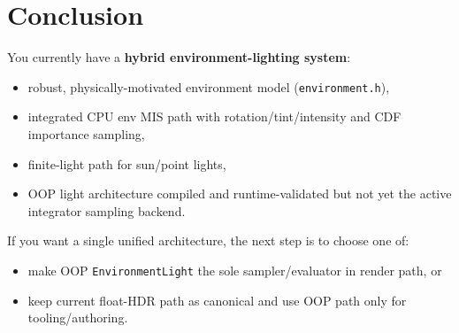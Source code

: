 \documentclass[11pt]{article}
\begin{document}
\section{Conclusion}
You currently have a \textbf{hybrid environment-lighting system}:
\begin{itemize}[leftmargin=1.5em]
  \item robust, physically-motivated environment model (\verb|environment.h|),
  \item integrated CPU env MIS path with rotation/tint/intensity and CDF importance sampling,
  \item finite-light path for sun/point lights,
  \item OOP light architecture compiled and runtime-validated but not yet the active integrator sampling backend.
\end{itemize}

If you want a single unified architecture, the next step is to choose one of:
\begin{itemize}[leftmargin=1.5em]
  \item make OOP \verb|EnvironmentLight| the sole sampler/evaluator in render path, or
  \item keep current float-HDR path as canonical and use OOP path only for tooling/authoring.
\end{itemize}
\end{document}
